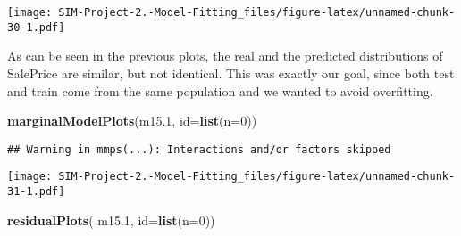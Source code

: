 \documentclass[
]{article}
\newenvironment{Shaded}{\begin{snugshade}}{\end{snugshade}}
\newcommand{\AttributeTok}[1]{\textcolor[rgb]{0.13,0.29,0.53}{#1}}
\newcommand{\DecValTok}[1]{\textcolor[rgb]{0.00,0.00,0.81}{#1}}
\newcommand{\FloatTok}[1]{\textcolor[rgb]{0.00,0.00,0.81}{#1}}
\newcommand{\FunctionTok}[1]{\textcolor[rgb]{0.13,0.29,0.53}{\textbf{#1}}}
\newcommand{\NormalTok}[1]{#1}
\newcommand{\SpecialCharTok}[1]{\textcolor[rgb]{0.81,0.36,0.00}{\textbf{#1}}}
\newcommand{\StringTok}[1]{\textcolor[rgb]{0.31,0.60,0.02}{#1}}
\begin{document}
\begin{Shaded}
\end{Shaded}

\texttt{[image: SIM-Project-2.-Model-Fitting\_files/figure-latex/unnamed-chunk-30-1.pdf]}

As can be seen in the previous plots, the real and the predicted
distributions of SalePrice are similar, but not identical. This was
exactly our goal, since both test and train come from the same
population and we wanted to avoid overfitting.

\begin{Shaded}
\begin{Highlighting}[]
\FunctionTok{marginalModelPlots}\NormalTok{(m15}\FloatTok{.1}\NormalTok{, }\AttributeTok{id=}\FunctionTok{list}\NormalTok{(}\AttributeTok{n=}\DecValTok{0}\NormalTok{))}
\end{Highlighting}
\end{Shaded}

\begin{verbatim}
## Warning in mmps(...): Interactions and/or factors skipped
\end{verbatim}

\texttt{[image: SIM-Project-2.-Model-Fitting\_files/figure-latex/unnamed-chunk-31-1.pdf]}

\begin{Shaded}
\begin{Highlighting}[]
\FunctionTok{residualPlots}\NormalTok{( m15}\FloatTok{.1}\NormalTok{, }\AttributeTok{id=}\FunctionTok{list}\NormalTok{(}\AttributeTok{n=}\DecValTok{0}\NormalTok{))}
\end{Highlighting}
\end{Shaded}
\end{document}
